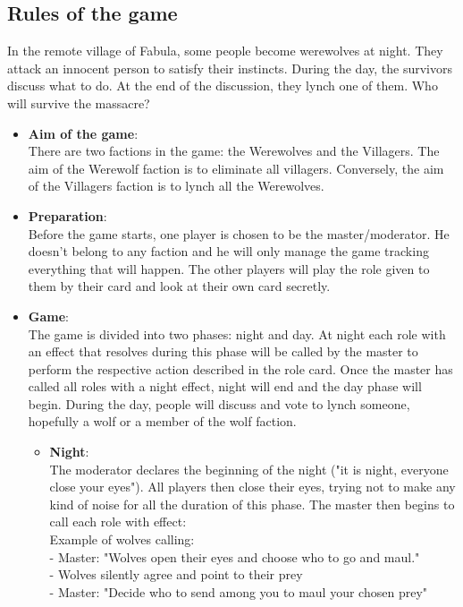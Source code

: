 \subsection{Rules of the game}
In the remote village of Fabula, some people become werewolves at night. They attack an innocent person to satisfy their instincts. During the day, the survivors discuss what to do. At the end of the discussion, they lynch one of them. Who will survive the massacre?
\\
\begin{itemize}
    \item \textbf{Aim of the game}: \\There are two factions in the game: the Werewolves and the Villagers. The aim of the Werewolf faction is to eliminate all villagers. Conversely, the aim of the Villagers faction is to lynch all the Werewolves.
    \item \textbf{Preparation}: \\Before the game starts, one player is chosen to be the master/moderator. He doesn't belong to any faction and he will only manage the game tracking everything that will happen. The other players will play the role given to them by their card and look at their own card secretly.
    \item \textbf{Game}: \\The game is divided into two phases: night and day. At night each role with an effect that resolves during this phase will be called by the master to perform the respective action described in the role card. Once the master has called all roles with a night effect, night will end and the day phase will begin. During the day, people will discuss and vote to lynch someone, hopefully a wolf or a member of the wolf faction. 
    \begin{itemize}
        \item \textbf{Night}: \\The moderator declares the beginning of the night ("it is night, everyone close your eyes"). All players then close their eyes, trying not to make any kind of noise for all the duration of this phase.
        The master then begins to call each role with effect:\\
        Example of wolves calling:\\
        - Master: "Wolves open their eyes and choose who to go and maul."\\
        - Wolves silently agree and point to their prey\\
        - Master: "Decide who to send among you to maul your chosen prey"\\

\end{itemize}
\end{itemize}
